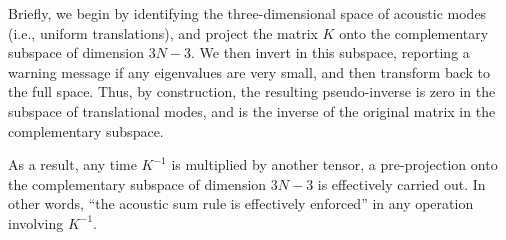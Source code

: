 \documentclass[11pt,fleqn]{article}
\def\wt#1{\widetilde{#1}}
\def\E{{\cal E}}
\begin{document}
Briefly, we begin by identifying the three-dimensional space of
acoustic modes (i.e., uniform translations), and project the
matrix $K$ onto the complementary subspace of dimension $3N-3$.
We then invert in this subspace, reporting a warning message if
any eigenvalues are very small, and then transform back to the
full space.  Thus, by construction, the resulting pseudo-inverse
is zero in the subspace of translational modes, and is the inverse
of the original matrix in the complementary subspace.

As a result, any time $K^{-1}$ is multiplied by another tensor,
a pre-projection onto the complementary subspace of dimension $3N-3$
is effectively carried out.  In other words, ``the acoustic
sum rule is effectively enforced'' in any operation involving
$K^{-1}$.

%
%
%
%
%
%
\end{document}
